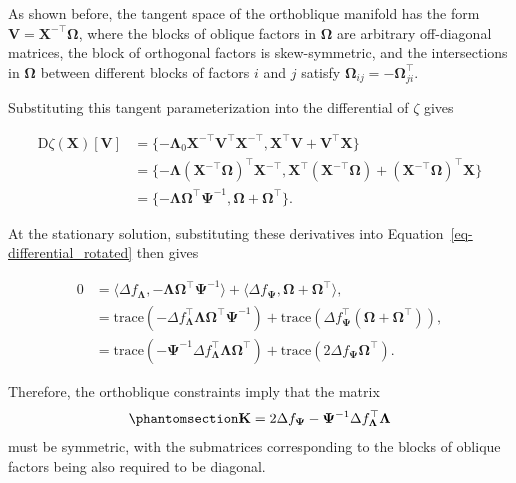 \documentclass[
  12pt,
  letterpaper,
  article]{scrartcl}
\begin{document}
As shown before, the tangent space of the orthoblique manifold has the
form \(\mathbf{V} = \mathbf{X}^{-\top}\mathbf{\Omega}\), where the
blocks of oblique factors in \(\mathbf{\Omega}\) are arbitrary
off-diagonal matrices, the block of orthogonal factors is
skew-symmetric, and the intersections in \(\mathbf{\Omega}\) between
different blocks of factors \(i\) and \(j\) satisfy
\(\mathbf{\Omega}_{ij}=-\mathbf{\Omega}_{ji}^\top\).

Substituting this tangent parameterization into the differential of
\(\zeta\) gives

\[
\begin{aligned}
\mathrm{D}\zeta(\mathbf{X})[\mathbf{V}]
&= \{-\mathbf{\Lambda}_0\mathbf{X}^{-\top}\mathbf{V}^{\top}\mathbf{X}^{-\top}, \mathbf{X}^\top \mathbf{V} + \mathbf{V}^\top \mathbf{X}\} \\
&= \{-\mathbf{\Lambda} (\mathbf{X}^{-\top}\mathbf{\Omega})^{\top} \mathbf{X}^{-\top}, \mathbf{X}^\top (\mathbf{X}^{-\top}\mathbf{\Omega}) + (\mathbf{X}^{-\top}\mathbf{\Omega})^\top \mathbf{X}\} \\
&= \{-\mathbf{\Lambda}\mathbf{\Omega}^\top\mathbf{\Psi}^{-1}, \mathbf{\Omega} + \mathbf{\Omega}^\top \} .
\end{aligned}
\]

At the stationary solution, substituting these derivatives into
Equation~\ref{eq-differential_rotated} then gives

\[
\begin{aligned}
0 &= \langle \Delta f_\mathbf{\Lambda}, -\mathbf{\Lambda}\mathbf{\Omega}^\top\mathbf{\Psi}^{-1} \rangle + \langle \Delta f_\mathbf{\Psi}, \mathbf{\Omega} + \mathbf{\Omega}^\top \rangle, \\
&= \mathrm{trace}(-\Delta f_\mathbf{\Lambda}^\top \mathbf{\Lambda}\mathbf{\Omega}^\top\mathbf{\Psi}^{-1}) + \mathrm{trace}(\Delta f_\mathbf{\Psi}^\top (\mathbf{\Omega} + \mathbf{\Omega}^\top)), \\
&= \mathrm{trace}(-\mathbf{\Psi}^{-1}\Delta f_\mathbf{\Lambda}^\top \mathbf{\Lambda}\mathbf{\Omega}^\top) + \mathrm{trace}(2\Delta f_\mathbf{\Psi} \mathbf{\Omega}^\top).
\end{aligned}
\]

Therefore, the orthoblique constraints imply that the matrix
\begin{equation}\protect\phantomsection\label{eq-orthblq_constraints}{
\mathbf{K} = 2\Delta f_\mathbf{\Psi} -\mathbf{\Psi}^{-1}\Delta f_\mathbf{\Lambda}^\top \mathbf{\Lambda}
}\end{equation} must be symmetric, with the submatrices corresponding to
the blocks of oblique factors being also required to be diagonal.
\end{document}

